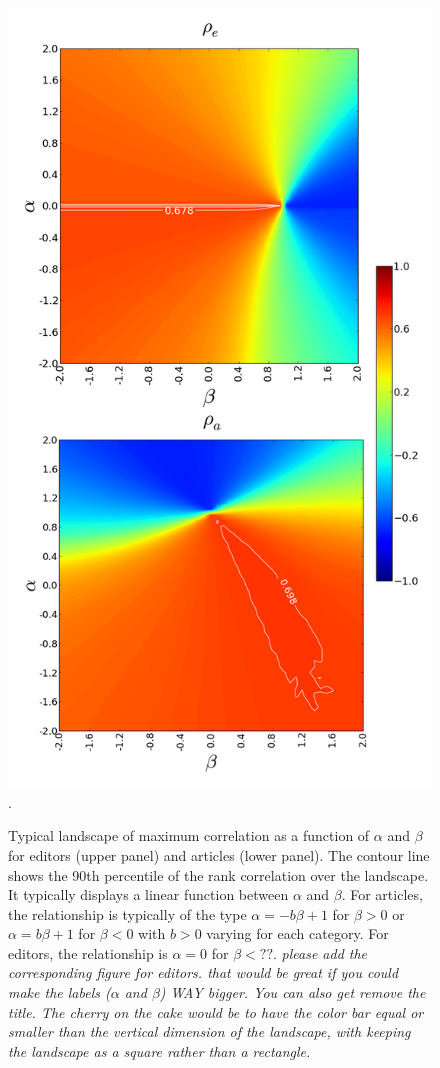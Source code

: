 \begin{figure}[!t]
\includegraphics[width=0.9\columnwidth]{Figures/contour_fem_combined.png}.
\caption{Typical landscape of maximum correlation as a function of $\alpha$ and $\beta$ for editors (upper panel) and articles (lower panel). The contour line shows the 90th percentile of the rank correlation over the landscape. It typically displays a linear function between $\alpha$ and $\beta$. For articles, the relationship is typically of the type $\alpha = - b \beta + 1$ for $\beta >0$ or $\alpha = b \beta + 1$ for $\beta < 0$ with $b>0$ varying for each category. For editors, the relationship is $\alpha = 0$ for $\beta < ??$. {\it please add the corresponding figure for editors.  that would be great if you could make the labels ($\alpha$ and $\beta$) WAY bigger. You can also get remove the title. The cherry on the cake would be to have the color bar equal or smaller than the vertical dimension of the landscape, with keeping the landscape as a square rather than a rectangle.}}
\label{fig:landscape}

\end{figure}

	



